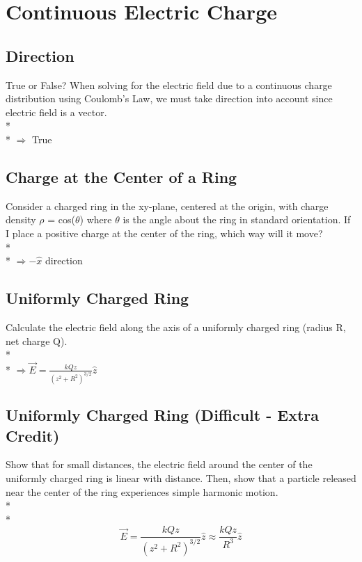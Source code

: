\documentclass[11pt]{article}
\begin{document}

\pagebreak
\section{Continuous Electric Charge}
\vspace{10pt}

\subsection{Direction}
True or False?  When solving for the electric field due to a continuous charge distribution using Coulomb's Law, we must take direction into account since electric field is a vector.\\* \\*
$\Rightarrow$ True

\subsection{Charge at the Center of a Ring}
Consider a charged ring in the xy-plane, centered at the origin, with charge density $\rho$ = cos($\theta$) where $\theta$ is the angle about the ring in standard orientation.  If I place a positive charge at the center of the ring, which way will it move? \\* \\*
$\Rightarrow -\hat{x}$ direction

\subsection{Uniformly Charged Ring}
Calculate the electric field along the axis of a uniformly charged ring (radius R, net charge Q). \\* \\*
$\Rightarrow \vec{E} = \frac{kQz}{(z^2 + R^2)^{3/2}}\hat{z}$

\subsection{Uniformly Charged Ring (Difficult - Extra Credit)}
Show that for small distances, the electric field around the center of the uniformly charged ring is linear with distance.  Then, show that a particle released near the center of the ring experiences simple harmonic motion. \\* \\*
\begin{equation}
\vec{E} = \frac{kQz}{(z^2 + R^2)^{3/2}}\hat{z} \approx \frac{kQz}{R^3}\hat{z}
\end{equation}
\end{document}

